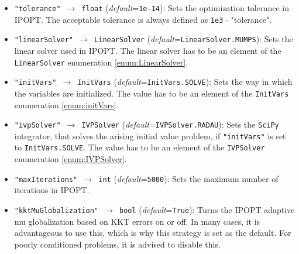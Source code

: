 \documentclass[12pt]{article}
\begin{document}
\begin{mdframed}[backgroundcolor=gray!10, roundcorner=10pt,
		linewidth=1pt]

	\begin{itemize}

		\label{flag:tolerance}
		\item \texttt{"tolerance" $\rightarrow$ float}
		      (\emph{default}=\texttt{1e-14}): Sets the optimization
		      tolerance in IPOPT. The
		      acceptable tolerance is always defined as \texttt{1e3}
		      $\cdot$ "tolerance".

		      \label{flag:linearSolver}
		\item \texttt{"linearSolver" $\rightarrow$ LinearSolver}
		      (\emph{default}=\texttt{LinearSolver.MUMPS}): Sets the
		      linear solver used in
		      IPOPT. The linear solver has to be an element of the
		      \texttt{LinearSolver}
		      enumeration \eqref{enum:LinearSolver}.

		      \label{flag:initVars}
		\item \texttt{"initVars" $\rightarrow$ InitVars}
		      (\emph{default}=\texttt{InitVars.SOLVE}): Sets the way in
		      which the variables
		      are initialized. The value has to be an element of the
		      \texttt{InitVars}
		      enumeration \eqref{enum:initVars}.

		      \label{flag:ivpSolver}
		\item \texttt{"ivpSolver" $\rightarrow$ IVPSolver}
		      (\emph{default}=\texttt{IVPSolver.RADAU}): Sets the
		      \texttt{SciPy} integrator,
		      that solves the arising initial value problem, if
		      \texttt{"initVars"} is set to
		      \texttt{InitVars.SOLVE}. The value has to be an element
		      of the
		      \texttt{IVPSolver} enumeration \eqref{enum:IVPSolver}.

		      \label{flag:maxIterations}
		\item \texttt{"maxIterations" $\rightarrow$ int}
		      (\emph{default}=\texttt{5000}): Sets the maximum
		      number of iterations in IPOPT.

			\label{flag:kktmuglobalization}
			\item \texttt{"kktMuGlobalization" $\rightarrow$ bool}
			(\emph{default}=\texttt{True}): Turns the IPOPT adaptive mu globalization based on KKT errors on or off. In many cases, it is advantageous to use this, which is why this strategy is set as the default. For poorly conditioned problems, it is advised to disable this.


\end{itemize}
\end{mdframed}
\end{document}
